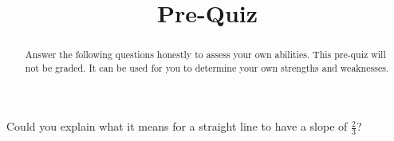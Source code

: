 \documentclass{ximera}
\title{Pre-Quiz}
\begin{document}
\begin{abstract}
Answer the following questions honestly to assess your own abilities. This pre-quiz will not be graded. It can be used for you to determine your own strengths and weaknesses.
\end{abstract}
\maketitle


\begin{question}

    Could you explain what it means for a straight line to have a slope of $\frac{2}{3}$?
    
    \begin{multipleChoice}
    \end{multipleChoice}

\end{question}

\end{document}
